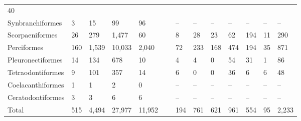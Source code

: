 \documentclass[11pt]{exam}
\begin{document}
\begin{landscape}
\begin{longtable}[l]{@{}L{1.4in}R{0.3in}R{0.4in}R{0.4in}R{0.4in}lR{0.3in}R{0.3in}R{0.3in}R{0.3in}R{0.3in}R{0.4in}R{0.4in}@{}}
40\tabularnewline
Synbranchiformes & 3 & 15 & 99 & 96 & & – & – & – & – & – & – &
–\tabularnewline
Scorpaeniformes & 26 & 279 & 1,477 & 60 & & 8 & 28 & 23 & 62 & 194 & 11 &
290\tabularnewline
Perciformes & 160 & 1,539 & 10,033 & 2,040 & & 72 & 233 & 168 & 474 & 194
& 35 & 871\tabularnewline
Pleuronectiformes & 14 & 134 & 678 & 10 & & 4 & 4 & 0 & 54 & 31 & 1 &
86\tabularnewline
Tetraodontiformes & 9 & 101 & 357 & 14 & & 6 & 0 & 0 & 36 & 6 & 6 &
48\tabularnewline
Coelacanthiformes & 1 & 1 & 2 & 0 & & – & – & – & – & – & – &
–\tabularnewline
Ceratodontiformes & 3 & 3 & 6 & 6 & ~ & – & – & – & – & – & – &
–\tabularnewline
\midrule
Total & 515 & 4,494 & 27,977 & 11,952 & & 194 & 761 & 621 & 961 & 554 &
95 & 2,233\tabularnewline
\bottomrule
\end{longtable}

\end{landscape}
\end{document}
